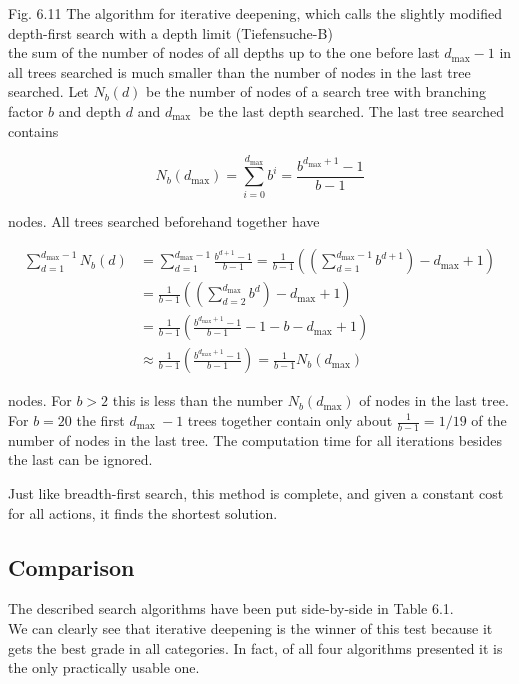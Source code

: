 \documentclass[10pt]{book}
\begin{document}
Fig. 6.11 The algorithm for iterative deepening, which calls the slightly modified depth-first search with a depth limit (Tiefensuche-B)\\
the sum of the number of nodes of all depths up to the one before last $d_{\text{max}}-1$ in all trees searched is much smaller than the number of nodes in the last tree searched.
Let $N_{b}(d)$ be the number of nodes of a search tree with branching factor $b$ and depth $d$ and $d_{\text {max }}$ be the last depth searched. The last tree searched contains

$$
N_{b}\left(d_{\max }\right)=\sum_{i=0}^{d_{\max }} b^{i}=\frac{b^{d_{\max }+1}-1}{b-1}
$$

nodes. All trees searched beforehand together have

$$
\begin{aligned}
\sum_{d=1}^{d_{\max }-1} N_{b}(d) & =\sum_{d=1}^{d_{\max }-1} \frac{b^{d+1}-1}{b-1}=\frac{1}{b-1}\left(\left(\sum_{d=1}^{d_{\max }-1} b^{d+1}\right)-d_{\max }+1\right) \\
& =\frac{1}{b-1}\left(\left(\sum_{d=2}^{d_{\max }} b^{d}\right)-d_{\max }+1\right) \\
& =\frac{1}{b-1}\left(\frac{b^{d_{\max }+1}-1}{b-1}-1-b-d_{\max }+1\right) \\
& \approx \frac{1}{b-1}\left(\frac{b^{d_{\max }+1}-1}{b-1}\right)=\frac{1}{b-1} N_{b}\left(d_{\max }\right)
\end{aligned}
$$

nodes. For $b>2$ this is less than the number $N_{b}\left(d_{\max }\right)$ of nodes in the last tree. For $b=20$ the first $d_{\text {max }}-1$ trees together contain only about $\frac{1}{b-1}=1 / 19$ of the number of nodes in the last tree. The computation time for all iterations besides the last can be ignored.

Just like breadth-first search, this method is complete, and given a constant cost for all actions, it finds the shortest solution.

\subsection{Comparison}
The described search algorithms have been put side-by-side in Table 6.1.\\
We can clearly see that iterative deepening is the winner of this test because it gets the best grade in all categories. In fact, of all four algorithms presented it is the only practically usable one.
\end{document}
